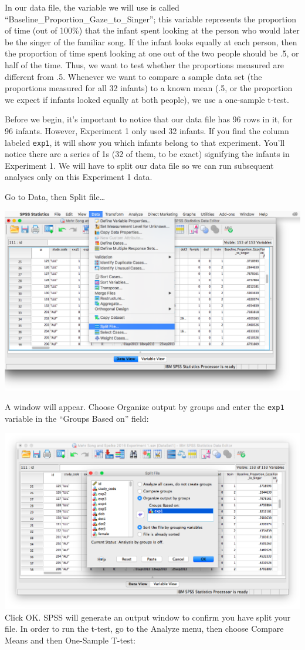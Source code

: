\documentclass[
]{book}
\begin{document}
In our data file, the variable we will use is called ``Baseline\_Proportion\_Gaze\_to\_Singer''; this variable represents the proportion of time (out of 100\%) that the infant spent looking at the person who would later be the singer of the familiar song. If the infant looks equally at each person, then the proportion of time spent looking at one out of the two people should be .5, or half of the time. Thus, we want to test whether the proportions measured are different from .5. Whenever we want to compare a sample data set (the proportions measured for all 32 infants) to a known mean (.5, or the proportion we expect if infants looked equally at both people), we use a one-sample t-test.

Before we begin, it's important to notice that our data file has 96 rows in it, for 96 infants. However, Experiment 1 only used 32 infants. If you find the column labeled \texttt{exp1}, it will show you which infants belong to that experiment. You'll notice there are a series of 1s (32 of them, to be exact) signifying the infants in Experiment 1. We will have to split our data file so we can run subsequent analyses only on this Experiment 1 data.

Go to {Data}, then {Split file\ldots{}}

\includegraphics{img/6.4.12.png}

A window will appear. Choose {Organize output by groups} and enter the \texttt{exp1} variable in the ``Groups Based on'' field:

\includegraphics{img/6.4.13.png}
Click {OK}. SPSS will generate an output window to confirm you have split your file. In order to run the t-test, go to the {Analyze} menu, then choose {Compare Means} and then {One-Sample T-test}:
\end{document}
